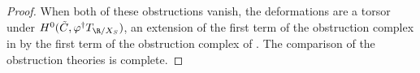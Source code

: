 \documentclass[a4paper,12pt]{article} %
\newcommand{\MWvone}[1]{}%
\newcommand{\MWref}[1]{#1}
\newcommand{\bb}[1]{{\mathbb{#1}}}
\newcommand{\ca}[1]{{\mathcal{#1}}}
\def\sheafhom{\mathcal{H}om}
\theoremstyle{definition}
\newtheorem{remark}[definition]{Remark}
\theoremstyle{plain}%
\renewcommand{\phi}{\varphi}
\begin{document}
\begin{proof}



When both of these obstructions vanish, the deformations are a torsor under $H^0(\tilde{C}, \phi^\dagger T_{\R/X_S} )$, an extension of the first term of the obstruction complex in \cite[Proposition \MWref{5.6.5.3}\MWvone{5.20}]{Marcus2017Logarithmic-com} by the first term of the obstruction complex of \cite[Proposition \MWref{5.6.4.1}\MWvone{5.17}]{Marcus2017Logarithmic-com}. The comparison of the obstruction theories is complete. %
\end{proof}
\end{document}
